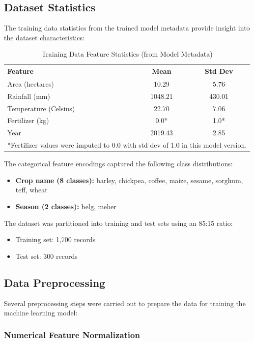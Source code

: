 \subsection{Dataset Statistics}

The training data statistics from the trained model metadata provide insight into the dataset characteristics:

\begin{table}[H]
\centering
\caption{Training Data Feature Statistics (from Model Metadata)}
\label{tab:feature-stats}
\begin{tabular}{lcc}
\toprule
\textbf{Feature} & \textbf{Mean} & \textbf{Std Dev} \\
\midrule
Area (hectares) & 10.29 & 5.76 \\
Rainfall (mm) & 1048.21 & 430.01 \\
Temperature (Celsius) & 22.70 & 7.06 \\
Fertilizer (kg) & 0.0* & 1.0* \\
Year & 2019.43 & 2.85 \\
\bottomrule
\multicolumn{3}{l}{*Fertilizer values were imputed to 0.0 with std dev of 1.0 in this model version.}
\end{tabular}
\end{table}

The categorical feature encodings captured the following class distributions:
\begin{itemize}
  \item \textbf{Crop name (8 classes):} barley, chickpea, coffee, maize, sesame, sorghum, teff, wheat
  \item \textbf{Season (2 classes):} belg, meher
\end{itemize}

The dataset was partitioned into training and test sets using an 85:15 ratio:
\begin{itemize}
  \item Training set: 1,700 records
  \item Test set: 300 records
\end{itemize}

\subsection{Data Preprocessing}

Several preprocessing steps were carried out to prepare the data for training the machine learning model:

\subsubsection{Numerical Feature Normalization}

